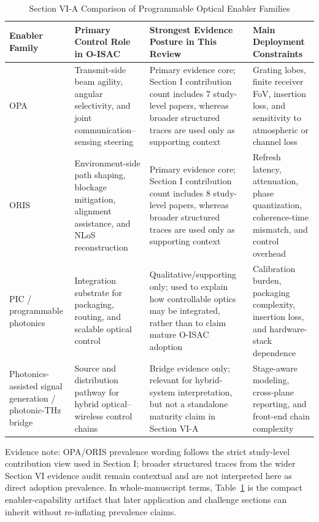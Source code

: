 \documentclass[lettersize,journal]{IEEEtran}
\begin{document}
\begin{table}[!t]
\caption{Section VI-A Comparison of Programmable Optical Enabler Families}
\label{tab:vi_a_enablers}
\centering
\footnotesize
\begin{tabularx}{\textwidth}{@{}%
>{\raggedright\arraybackslash}p{2.0cm}
>{\raggedright\arraybackslash}X
>{\raggedright\arraybackslash}X
>{\raggedright\arraybackslash}X
@{}}
\toprule
\textbf{Enabler Family} &
\textbf{Primary Control Role in O-ISAC} &
\textbf{Strongest Evidence Posture in This Review} &
\textbf{Main Deployment Constraints} \\
\midrule

OPA &
Transmit-side beam agility, angular selectivity, and joint communication--sensing steering &
Primary evidence core; Section I contribution count includes 7 study-level papers, whereas broader structured traces are used only as supporting context &
Grating lobes, finite receiver FoV, insertion loss, and sensitivity to atmospheric or channel loss \\

ORIS &
Environment-side path shaping, blockage mitigation, alignment assistance, and NLoS reconstruction &
Primary evidence core; Section I contribution count includes 8 study-level papers, whereas broader structured traces are used only as supporting context &
Refresh latency, attenuation, phase quantization, coherence-time mismatch, and control overhead \\

PIC / programmable photonics &
Integration substrate for packaging, routing, and scalable optical control &
Qualitative/supporting only; used to explain how controllable optics may be integrated, rather than to claim mature O-ISAC adoption &
Calibration burden, packaging complexity, insertion loss, and hardware-stack dependence \\

Photonics-assisted signal generation / photonic-THz bridge &
Source and distribution pathway for hybrid optical--wireless control chains &
Bridge evidence only; relevant for hybrid-system interpretation, but not a standalone maturity claim in Section VI-A &
Stage-aware modeling, cross-plane reporting, and front-end chain complexity \\
\bottomrule
\end{tabularx}
\end{table}





Evidence note: OPA/ORIS prevalence wording follows the strict study-level contribution view used in Section I; broader structured traces from the wider Section VI evidence audit remain contextual and are not interpreted here as direct adoption prevalence. In whole-manuscript terms, Table~\ref{tab:vi_a_enablers} is the compact enabler-capability artifact that later application and challenge sections can inherit without re-inflating prevalence claims.
\end{document}
